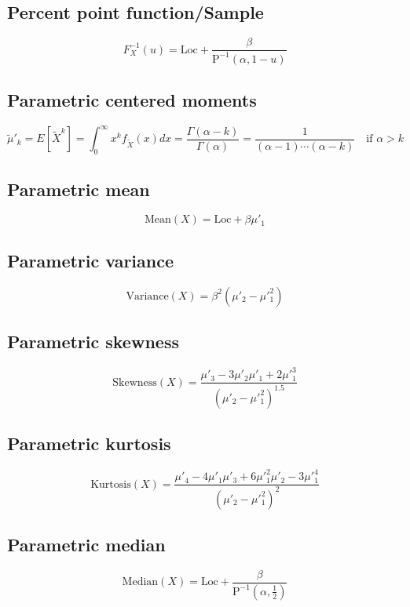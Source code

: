 \documentclass{article}
\begin{document}
\subsection{Percent point function/Sample}
\begin{equation*} F^{-1}_{X}\left(u\right)=\text{Loc}+\frac{\beta}{\text{P}^{-1}\left(\alpha,1-u\right)} \end{equation*}
\subsection{Parametric centered moments}
\begin{equation*} \tilde{\mu}'_{k}=E[\tilde{X}^k]=\int_{0}^{\infty}x^{k}f_{\tilde{X}}\left(x\right)dx=\frac{\Gamma(\alpha-k)}{\Gamma(\alpha)}=\frac{1}{(\alpha-1) \cdots (\alpha-k)}\quad \text{if } \alpha>k \end{equation*}
\subsection{Parametric mean}
\begin{equation*} \mathrm{Mean}(X)=\text{Loc}+\beta\mu'_{1} \end{equation*}
\subsection{Parametric variance}
\begin{equation*} \mathrm{Variance}(X)=\beta^{2}(\mu'_{2}-\mu'^{2}_{1}) \end{equation*}
\subsection{Parametric skewness}
\begin{equation*} \mathrm{Skewness}(X)=\frac{\mu'_{3}-3\mu'_{2}\mu'_{1}+2\mu'^{3}_{1}}{(\mu'_{2}-\mu'^{2}_{1})^{1.5}} \end{equation*}
\subsection{Parametric kurtosis}
\begin{equation*} \mathrm{Kurtosis}(X)=\frac{\mu'_{4}-4\mu'_{1}\mu'_{3}+6\mu'^{2}_{1}\mu'_{2}-3\mu'^{4}_{1}}{(\mu'_{2}-\mu'^{2}_{1})^{2}} \end{equation*}
\subsection{Parametric median}
\begin{equation*} \mathrm{Median}(X)=\text{Loc}+\frac{\beta}{\text{P}^{-1}\left(\alpha,\frac{1}{2}\right)} \end{equation*}
\end{document}
